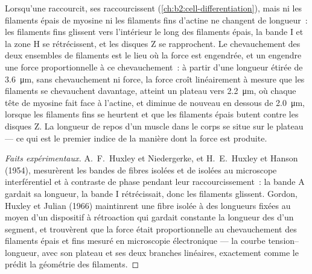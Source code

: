 \begin{proposition}\label{prop:b2:muscle-movement:sliding}
Lorsqu'une  raccourcit, ses  raccourcissent
(\cref{ch:b2:cell-differentiation}), mais ni les filaments épais
de myosine ni les filaments fins d'actine ne changent de longueur~: les
filaments fins glissent vers l'intérieur le long des filaments épais, la
bande I et la zone H se rétrécissent, et les disques Z se rapprochent. Le
chevauchement des deux ensembles de filaments est le lieu où la force
est engendrée, et un  engendre une force proportionnelle à ce
chevauchement~: à partir d'une longueur étirée de \qty{3.6}{\micro m},
sans chevauchement ni force, la force croît linéairement à mesure que
les filaments se chevauchent davantage, atteint un plateau vers
\qty{2.2}{\micro m}, où chaque tête de myosine fait face à l'actine,
et diminue de nouveau en dessous de \qty{2.0}{\micro m}, lorsque les
filaments fins se heurtent et que les filaments épais butent contre les
disques Z. La longueur de repos d'un muscle dans le corps se situe sur le
plateau --- ce qui est le premier indice de la manière dont la force est
produite.
\end{proposition}
\begin{proof}[Faits expérimentaux]
A.~F.~Huxley et Niedergerke, et H.~E.~Huxley et Hanson (1954),
mesurèrent les bandes de fibres isolées et de  isolées au
microscope interférentiel et à contraste de phase pendant leur
raccourcissement~: la bande A gardait sa longueur, la bande I
rétrécissait, donc les filaments glissent. Gordon,
Huxley et Julian (1966) maintinrent une fibre isolée à des longueurs
fixées au moyen d'un dispositif à rétroaction qui gardait constante la
longueur des  d'un segment, et trouvèrent que la force était
proportionnelle au chevauchement des filaments épais et fins mesuré en
microscopie électronique --- la courbe tension--longueur, avec son
plateau et ses deux branches linéaires, exactement comme le prédit la
géométrie des filaments.
\end{proof}

